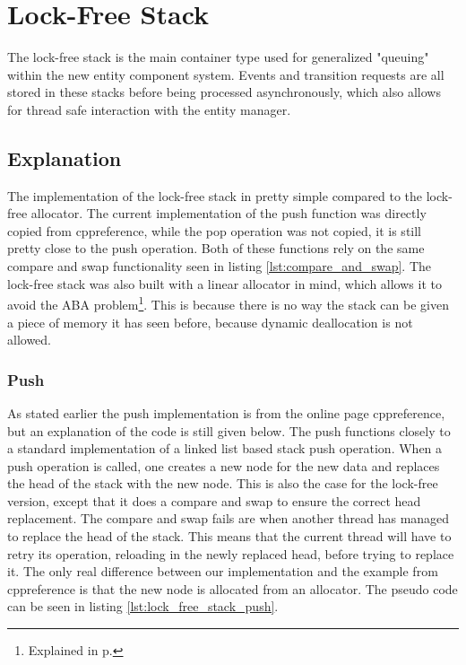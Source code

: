 \section{Lock-Free Stack}
\label{subsec:detailed_lock_free_stack}
The lock-free stack is the main container type used for generalized "queuing" within
the new entity component system. Events and transition requests are all stored
in these stacks before being processed asynchronously, which also
allows for thread safe interaction with the entity manager.

\subsection{Explanation}
The implementation of the lock-free stack in pretty simple compared to the lock-free allocator.
The current implementation of the push function was directly copied from cppreference\cite{cppreference_atomic_compare_exchange},
while the pop operation was not copied, it is still pretty close to the push operation.
Both of these functions rely on the same compare and swap functionality seen in listing \ref{lst:compare_and_swap}.
The lock-free stack was also built with a linear allocator in mind, which allows it to avoid the ABA problem\footnote{Explained in p.\pageref{subpar:detailed_lock_free_allocator_aba}}.
This is because there is no way the stack can be given a piece of memory it has seen before, because dynamic deallocation is not allowed.

\subsubsection{Push}
As stated earlier the push implementation is from the online page cppreference\cite{cppreference_atomic_compare_exchange}, but an explanation of the code is still given below.
The push functions closely to a standard implementation of a linked list based stack push operation.
When a push operation is called, one creates a new node for the new data and replaces the head of the stack with the new node.
This is also the case for the lock-free version, except that it does a compare and swap
to ensure the correct head replacement.
The compare and swap fails are when another thread has managed to replace the head
of the stack. This means that the current thread will have to retry its operation, reloading in the newly replaced head, before trying to replace it.
The only real difference between our implementation and the example from cppreference is that the new node is allocated from an allocator.
The pseudo code can be seen in listing \ref{lst:lock_free_stack_push}.


